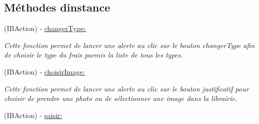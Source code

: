 \subsection*{Méthodes d\textquotesingle{}instance}
\begin{DoxyCompactItemize}
\item 
\hypertarget{interface_frais_table_view_controller_a9e9503cbeb176649f71acbbb972c957b}{}(I\+B\+Action) -\/ \hyperlink{interface_frais_table_view_controller_a9e9503cbeb176649f71acbbb972c957b}{changer\+Type\+:}\label{interface_frais_table_view_controller_a9e9503cbeb176649f71acbbb972c957b}

\begin{DoxyCompactList}\small\item\em Cette fonction permet de lancer une alerte au clic sur le bouton changer\+Type afin de choisir le type du frais parmis la liste de tous les types. \end{DoxyCompactList}\item 
\hypertarget{interface_frais_table_view_controller_a786b7f79469b7053e7945f48b54a6995}{}(I\+B\+Action) -\/ \hyperlink{interface_frais_table_view_controller_a786b7f79469b7053e7945f48b54a6995}{choisir\+Image\+:}\label{interface_frais_table_view_controller_a786b7f79469b7053e7945f48b54a6995}

\begin{DoxyCompactList}\small\item\em Cette fonction permet de lancer une alerte au clic sur le bouton justificatif pour choisir de prendre une photo ou de sélectionner une image dans la librairie. \end{DoxyCompactList}\item 
\hypertarget{interface_frais_table_view_controller_aea8b4b64f0ac4d5b9ff0b0639984e454}{}(I\+B\+Action) -\/ \hyperlink{interface_frais_table_view_controller_aea8b4b64f0ac4d5b9ff0b0639984e454}{saisir\+:}\label{interface_frais_table_view_controller_aea8b4b64f0ac4d5b9ff0b0639984e454}


\end{DoxyCompactItemize}
